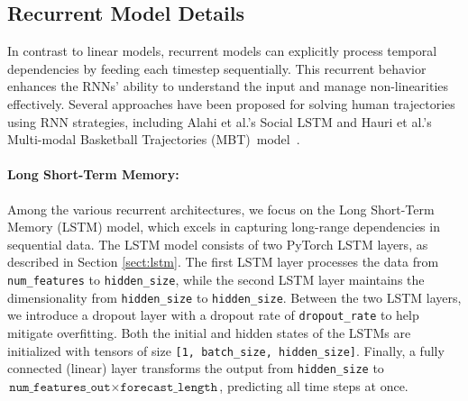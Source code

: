 \subsection{Recurrent Model  Details}
In contrast to linear models, recurrent models can explicitly process temporal dependencies by feeding each timestep sequentially. This recurrent behavior enhances the RNNs' ability to understand the input and manage non-linearities effectively. Several approaches have been proposed for solving human trajectories using RNN strategies, including Alahi et al.'s Social LSTM \cite{social-lstm} and Hauri et al.'s Multi-modal Basketball Trajectories (MBT)~model~\cite{MBT}.

\paragraph{Long Short-Term Memory:} 
\label{sec:lstm-details}
Among the various recurrent architectures, we focus on the Long Short-Term Memory (LSTM) model, which excels in capturing long-range dependencies in sequential data. The LSTM model consists of two PyTorch LSTM layers, as described in Section \ref{sect:lstm}. The first LSTM layer processes the data from \texttt{num\_features} to \texttt{hidden\_size}, while the second LSTM layer maintains the dimensionality from \texttt{hidden\_size} to \texttt{hidden\_size}. Between the two LSTM layers, we introduce a dropout layer with a dropout rate of \texttt{dropout\_rate} to help mitigate overfitting. Both the initial and hidden states of the LSTMs are initialized with tensors of size \texttt{[1, batch\_size, hidden\_size]}. Finally, a fully connected (linear) layer transforms the output from \texttt{hidden\_size} to $\texttt{num\_features\_out} \times \texttt{forecast\_length}$, predicting all time steps at once.

